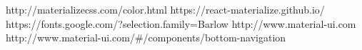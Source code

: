 http://materializecss.com/color.html
https://react-materialize.github.io/
https://fonts.google.com/?selection.family=Barlow   
http://www.material-ui.com
http://www.material-ui.com/#/components/bottom-navigation
